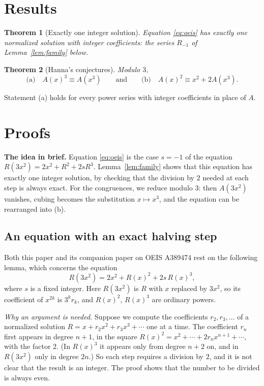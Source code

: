 \documentclass[11pt,a4paper]{article}
\newtheorem{theorem}{Theorem}[section]
\theoremstyle{definition}
\theoremstyle{remark}
\newcommand{\para}[1]{\par\medskip\noindent\textbf{#1}\enspace}
\begin{document}
\section{Results}\label{sec:results}

\begin{theorem}[Exactly one integer solution]\label{thm:exist}
Equation \eqref{eq:oeis} has exactly one normalized solution with integer coefficients: the series $R_{-1}$ of
Lemma~\ref{lem:family} below.
\end{theorem}

\begin{theorem}[Hanna's conjectures]\label{thm:three}
Modulo $3$,
\[
\text{(a)}\quad A(x)^3\equiv A(x^3)\qquad\text{and}\qquad\text{(b)}\quad A(x)^2\equiv x^2+2A(x^3).
\]
\end{theorem}
Statement (a) holds for every power series with integer coefficients in place of $A$.

\section{Proofs}\label{sec:proofs}

\para{The idea in brief.} Equation \eqref{eq:oeis} is the case $s=-1$ of the equation $R(3x^2)=2x^2+R^2+2sR^3$. Lemma~\ref{lem:family}
shows that this equation has exactly one integer solution, by checking that the division by $2$ needed at each step is
always exact. For the congruences, we reduce modulo $3$: then $A(3x^2)$ vanishes, cubing becomes the substitution
$x\mapsto x^3$, and the equation can be rearranged into (b).

\subsection{An equation with an exact halving step}
Both this paper and its companion paper on OEIS A389474 rest on the following lemma, which concerns the
equation
\begin{equation}\label{eq:family}
R(3x^2)=2x^2+R(x)^2+2s\,R(x)^3 ,
\end{equation}
where $s$ is a fixed integer. Here $R(3x^2)$ is $R$ with $x$ replaced by $3x^2$, so its coefficient of $x^{2k}$ is
$3^kr_k$, and $R(x)^2$, $R(x)^3$ are ordinary powers.

\emph{Why an argument is needed.} Suppose we compute the coefficients $r_2,r_3,\dots$ of a normalized
solution $R=x+r_2x^2+r_3x^3+\cdots$ one at a time. The coefficient $r_n$ first appears in degree $n+1$, in the square
$R(x)^2=x^2+\cdots+2r_nx^{n+1}+\cdots$, with the factor $2$. (In $R(x)^3$ it appears only from degree $n+2$ on, and in
$R(3x^2)$ only in degree $2n$.) So each step requires a division by $2$, and it is not clear that the result is an
integer. The proof shows that the number to be divided is always even.
\end{document}
